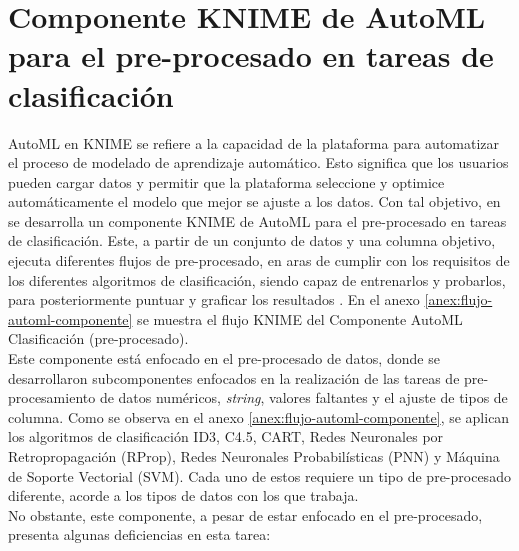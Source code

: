 \section{Componente KNIME de AutoML para el pre-procesado en tareas de clasificación}\label{epig:componente-ernesto}
AutoML en KNIME se refiere a la capacidad de la plataforma para automatizar el proceso de modelado de aprendizaje automático. Esto significa que los usuarios pueden cargar datos y permitir que la plataforma seleccione y optimice automáticamente el modelo que mejor se ajuste a los datos. Con tal objetivo, en \citep{Carrazana2022} se desarrolla un componente KNIME de AutoML para el pre-procesado en tareas de clasificación. Este, a partir de un conjunto de datos y una columna objetivo, ejecuta diferentes flujos de pre-procesado, en aras de cumplir con los requisitos de los diferentes algoritmos de clasificación, siendo capaz de entrenarlos y probarlos, para posteriormente puntuar y graficar los resultados \citep{Carrazana2022}. En el anexo \ref{anex:flujo-automl-componente} se muestra el flujo KNIME del Componente AutoML Clasificación (pre-procesado). \\
Este componente está enfocado en el pre-procesado de datos, donde se desarrollaron subcomponentes enfocados en la realización de las tareas de pre-procesamiento de datos numéricos, \textit{string}, valores faltantes y el ajuste de tipos de columna. Como se observa en el anexo \ref{anex:flujo-automl-componente}, se aplican los algoritmos de clasificación ID3, C4.5, CART, Redes Neuronales por Retropropagación (RProp), Redes Neuronales Probabilísticas (PNN) y Máquina de Soporte Vectorial (SVM). Cada uno de estos requiere un tipo de pre-procesado diferente, acorde a los tipos de datos con los que trabaja. \\
No obstante, este componente, a pesar de estar enfocado en el pre-procesado, presenta algunas deficiencias en esta tarea:
